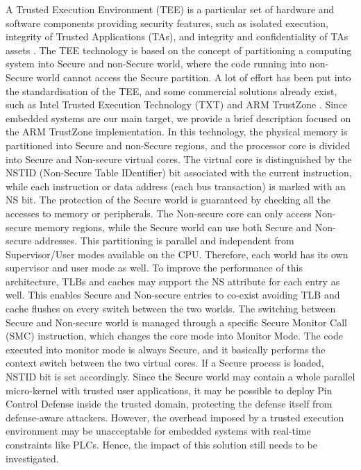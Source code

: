 A Trusted Execution Environment (TEE) is a particular set of hardware and software components providing security features,
such as isolated execution, integrity of Trusted Applications (TAs), and integrity and confidentiality of TAs assets \cite{tee}.
The TEE technology is based on the concept of partitioning a computing system into Secure and non-Secure world, where
the code running into non-Secure world cannot access the Secure partition.
A lot of effort has been put into the standardisation of the TEE, and some commercial solutions already exist,
such as Intel Trusted Execution Technology (TXT) \cite{intel-txt} and ARM TrustZone \cite{trustzone}.
Since embedded systems are our main target, we provide a brief description focused on the ARM TrustZone implementation.
In this technology, the physical memory is partitioned into Secure and non-Secure regions, and the processor core is divided into Secure and Non-secure virtual cores.
The virtual core is distinguished by the NSTID (Non-Secure Table IDentifier) bit associated with the current instruction,
while each instruction or data address (\ie each bus transaction) is marked with an NS bit.
The protection of the Secure world is guaranteed by checking all the accesses to memory or peripherals.
The Non-secure core can only access Non-secure memory regions, while the Secure world can use both Secure and Non-secure addresses.
This partitioning is parallel and independent from Supervisor/User modes available on the CPU. Therefore, each world has its own supervisor and user mode as well.
To improve the performance of this architecture, TLBs and caches may support the NS attribute for each entry as well.
This enables Secure and Non-secure entries to co-exist avoiding TLB and cache flushes on every switch between the two worlds.
The switching between Secure and Non-secure world is managed through a specific Secure Monitor Call (SMC) instruction,
which changes the core mode into Monitor Mode. The code executed into monitor mode is always Secure, and it basically performs the context switch
between the two virtual cores. If a Secure process is loaded, NSTID bit is set accordingly.
Since the Secure world may contain a whole parallel micro-kernel with trusted user applications, it may be possible
to deploy Pin Control Defense inside the trusted domain, protecting the defense itself from defense-aware attackers.
However, the overhead imposed by a trusted execution environment may be unacceptable for embedded systems with real-time constraints like PLCs.
Hence, the impact of this solution still needs to be investigated.


